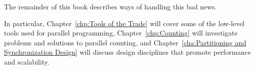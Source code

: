 The remainder of this book describes ways of handling this bad news.

In particular,
Chapter~\ref{chp:Tools of the Trade} will cover some of the low-level
tools used for parallel programming,
Chapter~\ref{chp:Counting} will investigate problems and solutions to
parallel counting, and
Chapter~\ref{cha:Partitioning and Synchronization Design}
will discuss design disciplines that promote performance and scalability.

